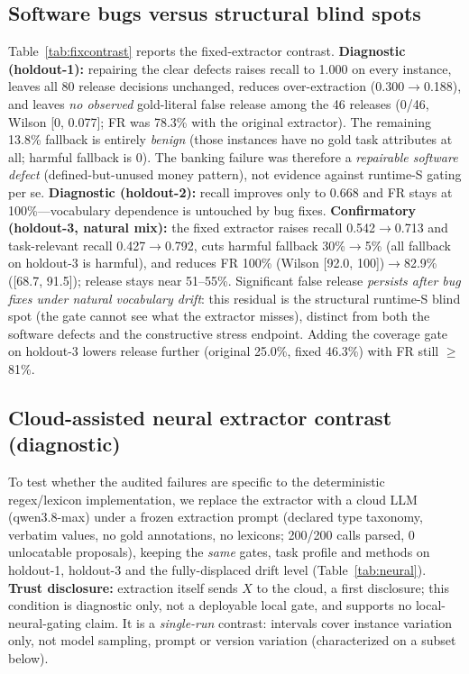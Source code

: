 \documentclass[journal]{IEEEtran}
\begin{document}
\subsection{Software bugs versus structural blind spots}\label{sec:res-fix}
Table~\ref{tab:fixcontrast} reports the fixed-extractor contrast. \textbf{Diagnostic (holdout-1):} repairing the clear defects raises recall to 1.000 on every instance, leaves all 80 release decisions unchanged, reduces over-extraction (0.300$\to$0.188), and leaves \emph{no observed} gold-literal false release among the 46 releases (0/46, Wilson [0, 0.077]; FR was 78.3\% with the original extractor). The remaining 13.8\% fallback is entirely \emph{benign} (those instances have no gold task attributes at all; harmful fallback is 0). The banking failure was therefore a \emph{repairable software defect} (defined-but-unused money pattern), not evidence against runtime-S gating per se. \textbf{Diagnostic (holdout-2):} recall improves only to 0.668 and FR stays at 100\%---vocabulary dependence is untouched by bug fixes. \textbf{Confirmatory (holdout-3, natural mix):} the fixed extractor raises recall 0.542$\to$0.713 and task-relevant recall 0.427$\to$0.792, cuts harmful fallback 30\%$\to$5\% (all fallback on holdout-3 is harmful), and reduces FR 100\% (Wilson [92.0, 100])$\to$82.9\% ([68.7, 91.5]); release stays near 51--55\%. Significant false release \emph{persists after bug fixes under natural vocabulary drift}: this residual is the structural runtime-S blind spot (the gate cannot see what the extractor misses), distinct from both the software defects and the constructive stress endpoint. Adding the coverage gate on holdout-3 lowers release further (original 25.0\%, fixed 46.3\%) with FR still $\ge$81\%.

\subsection{Cloud-assisted neural extractor contrast (diagnostic)}\label{sec:res-neural}
To test whether the audited failures are specific to the deterministic regex/lexicon implementation, we replace the extractor with a cloud LLM (qwen3.8-max) under a frozen extraction prompt (declared type taxonomy, verbatim values, no gold annotations, no lexicons; 200/200 calls parsed, 0 unlocatable proposals), keeping the \emph{same} gates, task profile and methods on holdout-1, holdout-3 and the fully-displaced drift level (Table~\ref{tab:neural}). \textbf{Trust disclosure:} extraction itself sends $X$ to the cloud, a first disclosure; this condition is diagnostic only, not a deployable local gate, and supports no local-neural-gating claim. It is a \emph{single-run} contrast: intervals cover instance variation only, not model sampling, prompt or version variation (characterized on a subset below).
\end{document}
